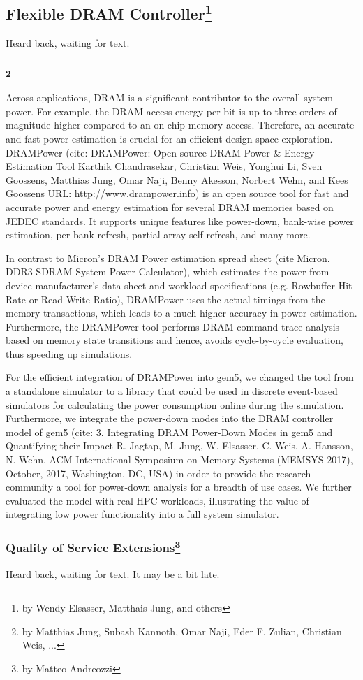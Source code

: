 \subsection[Flexible DRAM Controller]{Flexible DRAM Controller\footnote{by Wendy Elsasser, Matthais Jung, and others}}

Heard back, waiting for text.

\subsubsection[DRAMPower and DRAM Power-Down Modes]{\footnote{by Matthias Jung, Subash Kannoth, Omar Naji, Eder F. Zulian, Christian Weis, ...}}

Across applications, DRAM is a significant contributor to the overall system power.
For example, the DRAM access energy per bit is up to three orders of magnitude higher compared to an on-chip memory access.
Therefore, an accurate and fast power estimation is crucial for an efficient design space exploration.
DRAMPower (cite: DRAMPower: Open-source DRAM Power \& Energy Estimation Tool Karthik Chandrasekar, Christian Weis, Yonghui Li, Sven Goossens, Matthias Jung, Omar Naji, Benny Akesson, Norbert Wehn, and Kees Goossens URL: \url{http://www.drampower.info}) is an open source tool for fast and accurate power and energy estimation for several DRAM memories based on JEDEC standards.
It supports unique features like power-down, bank-wise power estimation, per bank refresh, partial array self-refresh, and many more.

In contrast to Micron’s DRAM Power estimation spread sheet (cite Micron. DDR3 SDRAM System Power Calculator), which estimates the power from device manufacturer’s data sheet and workload specifications (e.g. Rowbuffer-Hit-Rate or Read-Write-Ratio), DRAMPower uses the actual timings from the memory transactions, which leads to a much higher accuracy in power estimation.
Furthermore, the DRAMPower tool performs DRAM command trace analysis based on memory state transitions and hence, avoids cycle-by-cycle evaluation, thus speeding up simulations.

For the efficient integration of DRAMPower into gem5, we changed the tool from a standalone simulator to a library that could be used in discrete event-based simulators for calculating the power consumption online during the simulation.
Furthermore, we integrate the power-down modes into the DRAM controller model of gem5 (cite: 3.	Integrating DRAM Power-Down Modes in gem5 and Quantifying their Impact R. Jagtap, M. Jung, W. Elsasser, C. Weis, A. Hansson, N. Wehn. ACM International Symposium on Memory Systems (MEMSYS 2017), October, 2017, Washington, DC, USA) in order to provide the research community a tool for power-down analysis for a breadth of use cases. We further evaluated the model with real HPC workloads, illustrating the value of integrating low power functionality into a full system simulator.

\subsubsection[Quality of Service Extensions]{Quality of Service Extensions\footnote{by Matteo Andreozzi}}

Heard back, waiting for text.
It may be a bit late.
